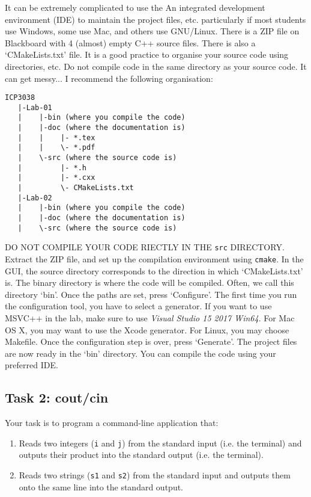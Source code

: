It can be extremely complicated to use the An integrated development environment (IDE) to maintain the project files, etc. particularly if most students use Windows, some use Mac, and others use GNU/Linux. 
There is a ZIP file on Blackboard with 4 (almost) empty C++ source files. There is also a `CMakeLists.txt' file. 
It is a good practice to organise your source code using directories, etc. Do not compile code in the same directory as your source code. It can get messy... 
I recommend the following organisation:
\begin{verbatim}
ICP3038
   |-Lab-01
   |    |-bin (where you compile the code)
   |    |-doc (where the documentation is)
   |    |    |- *.tex
   |    |    \- *.pdf
   |    \-src (where the source code is)
   |         |- *.h
   |         |- *.cxx
   |         \- CMakeLists.txt
   |-Lab-02
   |    |-bin (where you compile the code)
   |    |-doc (where the documentation is)
   |    \-src (where the source code is)
\end{verbatim}
DO NOT COMPILE YOUR CODE RIECTLY IN THE \verb+src+ DIRECTORY. 
Extract the ZIP file, and set up the compilation environment using \verb+cmake+. 
In the GUI, the source directory corresponds to the direction in which `CMakeLists.txt' is. 
The binary directory is where the code will be compiled. Often, we call this directory `bin'. 
Once the paths are set, press `Configure'. 
The first time you run the configuration tool, you have to select a generator.
If you want to use MSVC++ in the lab, make sure to use \emph{Visual Studio 15 2017 Win64}. 
For Mac OS X, you may want to use the Xcode generator. 
For Linux, you may choose Makefile. 
Once the configuration step is over, press `Generate'. 
The project files are now ready in the `bin' directory. 
You can compile the code using your preferred IDE.

\subsection*{Task 2: cout/cin}


Your task is to program a command-line application that:
\begin{enumerate}
  \item Reads two integers (\verb+i+ and \verb+j+) from the standard input (i.e. the terminal) and outputs their product into the standard output (i.e. the terminal).
  \item Reads two strings  (\verb+s1+ and \verb+s2+) from the standard input and outputs them onto the same line into the standard output.
\end{enumerate}

